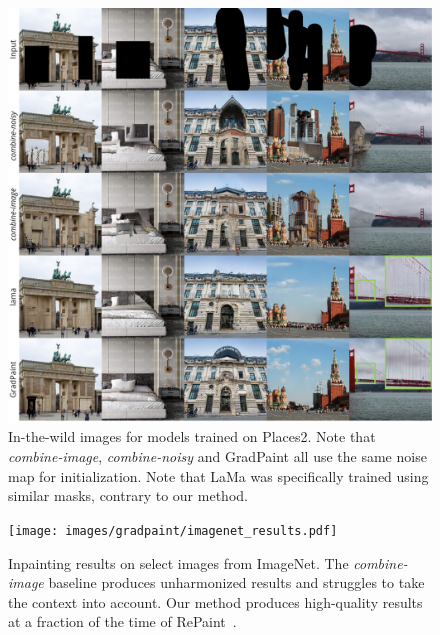     \begin{figure}[H]
      \hspace{-2cm} \includegraphics[width=1.2\linewidth]{images/gradpaint/places2.pdf} %
      \caption{In-the-wild images for models trained on Places2. Note that \emph{combine-image}, \emph{combine-noisy} and GradPaint all use the same noise map for initialization. Note that LaMa was specifically trained using similar masks, contrary to our method.}
      \label{fig:places}
    \end{figure}
  
  \begin{figure}[H]
    \centering
      \texttt{[image: images/gradpaint/imagenet\_results.pdf]} %
      \caption{Inpainting results on select images from ImageNet. The \emph{combine-image} baseline produces unharmonized results and struggles to take the context into account. Our method produces high-quality results at a fraction of the time of RePaint~\citep{lugmayr2022repaint}. }
      \label{fig:res2}
  \end{figure}
  
